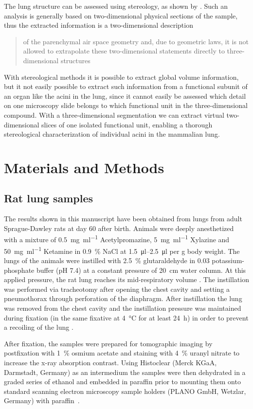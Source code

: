 \documentclass[%
	draft,
	paper=a4,%
	abstract=true,%
	]{scrartcl}
\begin{document}
The lung structure can be assessed using stereology, as shown by \citet{Tschanz2002}. Such an analysis is generally based on two-dimensional physical sections of the sample, thus the extracted information is a two-dimensional description \blockquote[\cite{Tschanz2002}]{of the parenchymal air space geometry and, due to geometric laws, it is not allowed to extrapolate these two-dimensional statements directly to three-dimensional structures}. With stereological methods it is possible to extract global volume information, but it not easily possible to extract such information from a functional subunit of an organ like the acini in the lung, since it cannot easily be assessed which detail on one microscopy slide belongs to which functional unit in the three-dimensional compound. With a three-dimensional segmentation we can extract virtual two-dimensional slices of one isolated functional unit, enabling a thorough stereological characterization of individual acini in the mammalian lung.

\section{Materials and Methods}
\subsection{Rat lung samples}
The results shown in this manuscript have been obtained from lungs from adult Sprague-Dawley rats at day 60 after birth. Animals were deeply anesthetized with a mixture of %
\SI{0.5}{\milli\gram\per\milli\litre} Acetylpromazine, %
\SI{5}{\milli\gram\per\milli\litre} Xylazine and %
\SI{50}{\milli\gram\per\milli\litre} Ketamine in %
\SI{0.9}{\percent} NaCl at \SIrange{1.5}{2.5}{\micro\litre} per \si{\gram} body weight. The lungs of the animals were instilled with \SI{2.5}{\percent} glutaraldehyde in \SI{0.03}{\Molar} potassium-phosphate buffer (pH 7.4) at a constant pressure of \SI{20}{\centi\meter} water column. At this applied pressure, the rat lung reaches its mid-respiratory volume \cite{Schittny1998}. The instillation was performed via tracheotomy after opening the chest cavity and setting a pneumothorax through perforation of the diaphragm. After instillation the lung was removed from the chest cavity and the instillation pressure was maintained during fixation (in the same fixative at \SI{4}{\celsius} for at least \SI{24}{\hour}) in order to prevent a recoiling of the lung \cite{Tschanz2002}.

After fixation, the samples were prepared for tomographic imaging by postfixation with \SI{1}{\percent} osmium acetate and staining with \SI{4}{\percent} uranyl nitrate to increase the x-ray absorption contrast. Using Histoclear (Merck KGaA, Darmstadt, Germany) as an intermedium the samples were then dehydrated in a graded series of ethanol and embedded in paraffin prior to mounting them onto standard scanning electron microscopy sample holders (PLANO GmbH, Wetzlar, Germany) with paraffin~\cite{Tsuda2008}.
\end{document}
